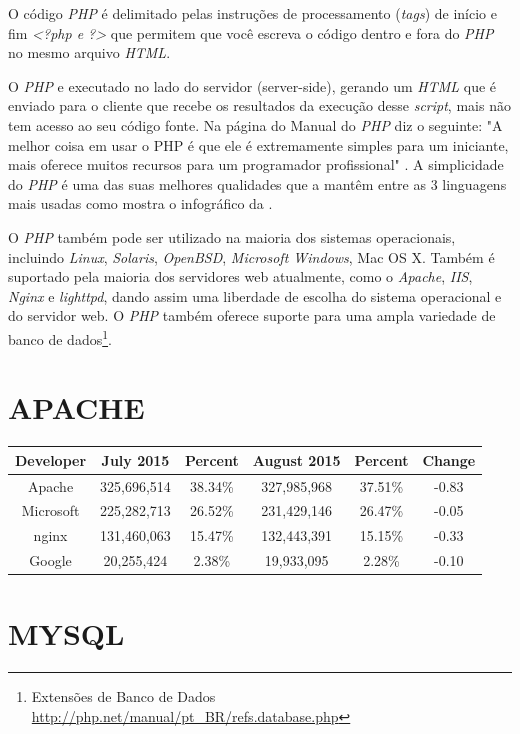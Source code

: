 \par
O código \textit{PHP} é delimitado pelas instruções de processamento (\textit{tags}) de início e fim \textit{<?php e ?>} que permitem que você escreva o código dentro e fora do \textit{PHP} no mesmo arquivo \textit{HTML}. \cite{php-intro}
\par
O \textit{PHP} e executado no lado do servidor (server-side), gerando um \textit{HTML} que é enviado para o cliente que recebe os resultados da execução desse \textit{script}, mais não tem acesso ao seu código fonte. Na página do Manual do \textit{PHP} diz o seguinte: "A melhor coisa em usar o PHP é que ele é extremamente simples para um iniciante, mais oferece muitos recursos para um programador profissional" . A simplicidade do \textit{PHP} é uma das suas melhores qualidades que a mantêm entre as 3 linguagens mais usadas como mostra o infográfico da .
\par
O \textit{PHP} também pode ser utilizado na maioria dos sistemas operacionais, incluindo \textit{Linux}, \textit{Solaris}, \textit{OpenBSD}, \textit{Microsoft Windows}, Mac OS X. Também é suportado pela maioria dos servidores web atualmente, como o \textit{Apache}, \textit{IIS}, \textit{Nginx} e \textit{lighttpd}, dando assim uma liberdade de escolha do sistema operacional e do servidor web. O \textit{PHP} também oferece suporte para uma ampla variedade de banco de dados\footnote{Extensões de Banco de Dados \url{http://php.net/manual/pt_BR/refs.database.php}}.


\section{APACHE}

\begin{tabular}{|c|c|c|c|c|c|}
    \hline Developer & July 2015 & Percent & August 2015 & Percent & Change \\ 
    \hline Apache & 325,696,514 & 38.34\% & 327,985,968 & 37.51\% & -0.83 \\ 
    \hline Microsoft & 225,282,713 & 26.52\% & 231,429,146 & 26.47\% & -0.05 \\ 
    \hline nginx & 131,460,063 & 15.47\% & 132,443,391 & 15.15\% & -0.33 \\ 
    \hline Google & 20,255,424 & 2.38\% & 19,933,095 & 2.28\% & -0.10 \\ 
\end{tabular} 

\section{MYSQL}

